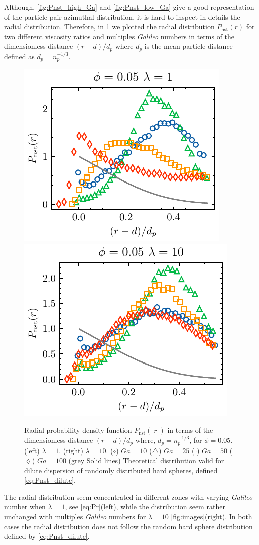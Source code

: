 Although, \ref{fig:Pnst_high_Ga} and \ref{fig:Pnst_low_Ga} give a good representation of the particle pair azimuthal distribution, it is hard to inspect in details the radial distribution.
Therefore, in \ref{fig:Pr}  we plotted the radial distribution $P_\text{nst}(r)$ for two different viscosity ratios and multiples \textit{Galileo} numbers in terms of the dimensionless distance $(r - d)/d_p$ where $d_p$ is the mean particle distance defined as $d_p = n_p^{-1/3}$.  
\begin{figure}[h!]
    \centering
    \includegraphics[height=0.35\textwidth]{image/HOMOGENEOUS_NEW/Dist/Pr_l_1_PHI_5.pdf}
    \includegraphics[height=0.35\textwidth]{image/HOMOGENEOUS_NEW/Dist/Pr_l_10_PHI_5.pdf}
    \caption{Radial probability density function $P_\text{nst}(|r|)$ in terms of the dimensionless distance $(r-d)/d_p$ where, $d_p = n_p^{-1/3}$, for  $\phi = 0.05$.
    (left)  $\lambda = 1$.
    (right) $\lambda = 10$.
    ($\circ$)  $Ga = 10$ 
    ($\triangle$)  $Ga = 25$ 
    ($\square$)  $Ga = 50$ 
    ($\lozenge$)  $Ga = 100$ 
    (grey Solid lines) Theoretical distribution valid for dilute dispersion of randomly distributed hard spheres, defined \ref{eq:Pnst_dilute}.
    }
    \label{fig:Pr}
\end{figure}
The radial distribution seem concentrated in different zones with varying \textit{Galileo} number when $\lambda = 1$, see \ref{eq:Pr}(left), while the distribution seem rather unchanged with multiples \textit{Galileo} numbers for $\lambda = 10$ \ref{fig:images}(right). 
In both cases the radial distribution does not follow the random hard sphere distribution defined by \ref{eq:Pnst_dilute}. 

